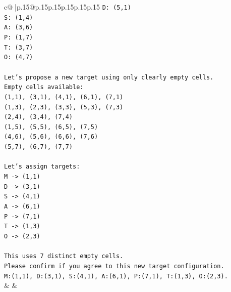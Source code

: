 \documentclass{article}
\begin{document}
{\begin{supertabular}{c@{$\;$}|p{.15\linewidth}@{}p{.15\linewidth}p{.15\linewidth}p{.15\linewidth}p{.15\linewidth}p{.15\linewidth}}
{{{\texttt{D: (5,1)} \\
\texttt{S: (1,4)} \\
\texttt{A: (3,6)} \\
\texttt{P: (1,7)} \\
\texttt{T: (3,7)} \\
\texttt{O: (4,7)} \\
\\ 
\texttt{Let's propose a new target using only clearly empty cells.} \\
\texttt{Empty cells available:} \\
\texttt{(1,1), (3,1), (4,1), (6,1), (7,1)} \\
\texttt{(1,3), (2,3), (3,3), (5,3), (7,3)} \\
\texttt{(2,4), (3,4), (7,4)} \\
\texttt{(1,5), (5,5), (6,5), (7,5)} \\
\texttt{(4,6), (5,6), (6,6), (7,6)} \\
\texttt{(5,7), (6,7), (7,7)} \\
\\ 
\texttt{Let's assign targets:} \\
\texttt{M {-}> (1,1)} \\
\texttt{D {-}> (3,1)} \\
\texttt{S {-}> (4,1)} \\
\texttt{A {-}> (6,1)} \\
\texttt{P {-}> (7,1)} \\
\texttt{T {-}> (1,3)} \\
\texttt{O {-}> (2,3)} \\
\\ 
\texttt{This uses 7 distinct empty cells.} \\
\texttt{Please confirm if you agree to this new target configuration.} \\
\texttt{M:(1,1), D:(3,1), S:(4,1), A:(6,1), P:(7,1), T:(1,3), O:(2,3).} \\
            }
        }
    }
    & & \\ \\


\end{supertabular}}
\end{document}
